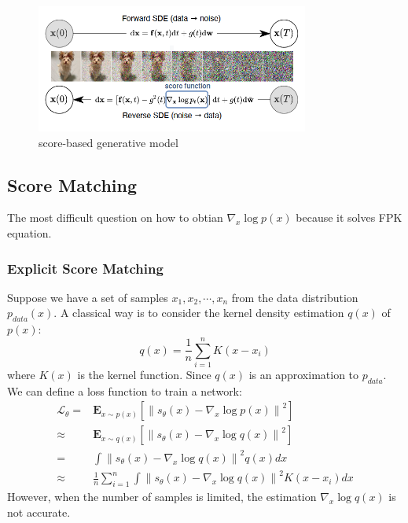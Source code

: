 \begin{figure}[h]
    \centering
    \includegraphics[width=0.8\textwidth]{./pics/score_based.png} %
    \caption{score-based generative model}
\end{figure}


\subsection{Score Matching}
The most difficult question on how to obtian $\nabla_x \log p(x)$ because it solves FPK equation.
\subsubsection{Explicit Score Matching}
Suppose we have a set of samples $x_1, x_2, \cdots, x_n$ from the data distribution $p_{data}(x)$. 
A classical way is to consider the kernel density estimation $q(x)$ of $p(x)$:
\begin{equation}
    q(x) = \frac{1}{n}\sum_{i=1}^n K(x-x_i)
\end{equation}
where $K(x)$ is the kernel function. Since $q(x)$ is an approximation to $p_{data}$. 
We can define a loss function to train a network:
\begin{equation}
    \begin{aligned}
        \mathcal{L}_\theta =& \mathbf{E}_{x\sim p(x)} \left[\left\|s_\theta(x) - \nabla_x \log p(x)\right\|^2\right]\\
        \approx& \mathbf{E}_{x\sim q(x)} \left[\left\|s_\theta(x) - \nabla_x \log q(x)\right\|^2\right]\\
        =& \int \left\|s_\theta (x) - \nabla_x \log q(x)\right\|^2 q(x) dx\\
        \approx & \frac{1}{n}\sum_{i=1}^n \int \left\|s_\theta (x) - \nabla_x \log q(x)\right\|^2 K(x-x_i) dx
    \end{aligned}
\end{equation}
However, when the number of samples is limited, the estimation $\nabla_x \log q(x)$ is not accurate.
